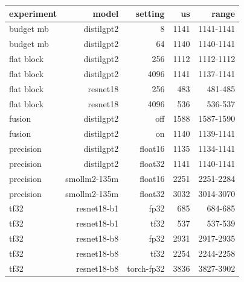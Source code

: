 \begin{tabular}{lrrrr}
\toprule
experiment & model & setting & us & range \\
\midrule
budget mb & distilgpt2 & 8 & 1141 & 1141-1141 \\
budget mb & distilgpt2 & 64 & 1140 & 1140-1141 \\
flat block & distilgpt2 & 256 & 1112 & 1112-1112 \\
flat block & distilgpt2 & 4096 & 1141 & 1137-1141 \\
flat block & resnet18 & 256 & 483 & 481-485 \\
flat block & resnet18 & 4096 & 536 & 536-537 \\
fusion & distilgpt2 & off & 1588 & 1587-1590 \\
fusion & distilgpt2 & on & 1140 & 1139-1141 \\
precision & distilgpt2 & float16 & 1135 & 1134-1141 \\
precision & distilgpt2 & float32 & 1141 & 1140-1141 \\
precision & smollm2-135m & float16 & 2251 & 2251-2284 \\
precision & smollm2-135m & float32 & 3032 & 3014-3070 \\
tf32 & resnet18-b1 & fp32 & 685 & 684-685 \\
tf32 & resnet18-b1 & tf32 & 537 & 537-539 \\
tf32 & resnet18-b8 & fp32 & 2931 & 2917-2935 \\
tf32 & resnet18-b8 & tf32 & 2254 & 2244-2258 \\
tf32 & resnet18-b8 & torch-fp32 & 3836 & 3827-3902 \\
\bottomrule
\end{tabular}
